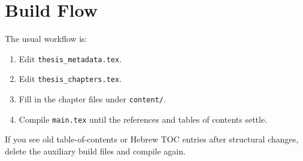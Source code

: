 \documentclass[11pt,a4paper]{article}
\begin{document}
\section{Build Flow}
The usual workflow is:
\begin{enumerate}[leftmargin=*]
    \item Edit \texttt{thesis\_metadata.tex}.
    \item Edit \texttt{thesis\_chapters.tex}.
    \item Fill in the chapter files under \texttt{content/}.
    \item Compile \texttt{main.tex} until the references and tables of contents settle.
\end{enumerate}

If you see old table-of-contents or Hebrew TOC entries after structural changes, delete the auxiliary build files and compile again.
\end{document}
